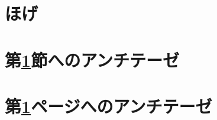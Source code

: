 \documentclass{jarticle}
\begin{document}
\tableofcontents
\section{ほげ}\label{sec:hoge}
\section{第\ref{sec:hoge}節へのアンチテーゼ}
\section{第\ref{sec:hoge}ページへのアンチテーゼ}
\end{document}
